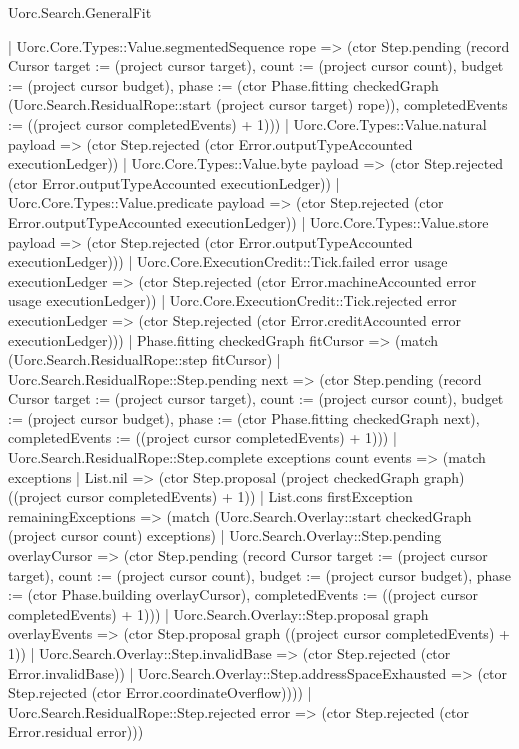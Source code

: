 \begin{lexlean}{Uorc.Search.GeneralFit}
\begin{semanticmodule}
{        | Uorc.Core.Types::Value.segmentedSequence rope => (ctor Step.pending (record Cursor {target := (project cursor target), count := (project cursor count), budget := (project cursor budget), phase := (ctor Phase.fitting checkedGraph (Uorc.Search.ResidualRope::start (project cursor target) rope)), completedEvents := ((project cursor completedEvents) + 1)}))
        | Uorc.Core.Types::Value.natural payload => (ctor Step.rejected (ctor Error.outputTypeAccounted executionLedger))
        | Uorc.Core.Types::Value.byte payload => (ctor Step.rejected (ctor Error.outputTypeAccounted executionLedger))
        | Uorc.Core.Types::Value.predicate payload => (ctor Step.rejected (ctor Error.outputTypeAccounted executionLedger))
        | Uorc.Core.Types::Value.store payload => (ctor Step.rejected (ctor Error.outputTypeAccounted executionLedger)))
      | Uorc.Core.ExecutionCredit::Tick.failed error usage executionLedger => (ctor Step.rejected (ctor Error.machineAccounted error usage executionLedger))
      | Uorc.Core.ExecutionCredit::Tick.rejected error executionLedger => (ctor Step.rejected (ctor Error.creditAccounted error executionLedger)))
    | Phase.fitting checkedGraph fitCursor => (match (Uorc.Search.ResidualRope::step fitCursor)
      | Uorc.Search.ResidualRope::Step.pending next => (ctor Step.pending (record Cursor {target := (project cursor target), count := (project cursor count), budget := (project cursor budget), phase := (ctor Phase.fitting checkedGraph next), completedEvents := ((project cursor completedEvents) + 1)}))
      | Uorc.Search.ResidualRope::Step.complete exceptions count events => (match exceptions
        | List.nil => (ctor Step.proposal (project checkedGraph graph) ((project cursor completedEvents) + 1))
        | List.cons firstException remainingExceptions => (match (Uorc.Search.Overlay::start checkedGraph (project cursor count) exceptions)
          | Uorc.Search.Overlay::Step.pending overlayCursor => (ctor Step.pending (record Cursor {target := (project cursor target), count := (project cursor count), budget := (project cursor budget), phase := (ctor Phase.building overlayCursor), completedEvents := ((project cursor completedEvents) + 1)}))
          | Uorc.Search.Overlay::Step.proposal graph overlayEvents => (ctor Step.proposal graph ((project cursor completedEvents) + 1))
          | Uorc.Search.Overlay::Step.invalidBase => (ctor Step.rejected (ctor Error.invalidBase))
          | Uorc.Search.Overlay::Step.addressSpaceExhausted => (ctor Step.rejected (ctor Error.coordinateOverflow))))
      | Uorc.Search.ResidualRope::Step.rejected error => (ctor Step.rejected (ctor Error.residual error)))
}
\end{semanticmodule}
\end{lexlean}
